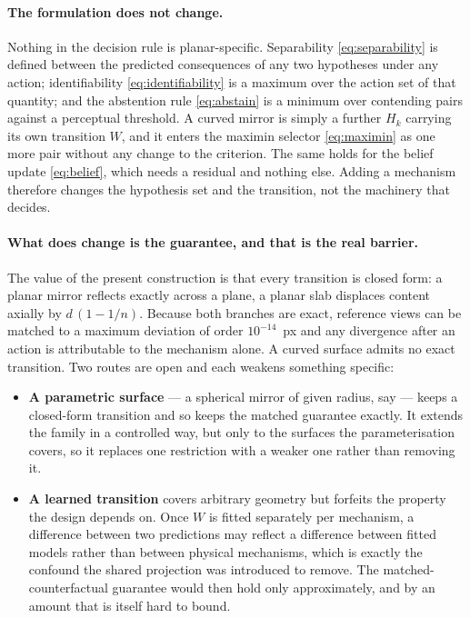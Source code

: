 \paragraph{The formulation does not change.}
Nothing in the decision rule is planar-specific. Separability
\eqref{eq:separability} is defined between the predicted consequences of any two
hypotheses under any action; identifiability \eqref{eq:identifiability} is a
maximum over the action set of that quantity; and the abstention rule
\eqref{eq:abstain} is a minimum over contending pairs against a perceptual
threshold. A curved mirror is simply a further $H_k$ carrying its own transition
$W$, and it enters the maximin selector \eqref{eq:maximin} as one more pair without
any change to the criterion. The same holds for the belief update
\eqref{eq:belief}, which needs a residual and nothing else. Adding a mechanism
therefore changes the hypothesis set and the transition, not the machinery that
decides.

\paragraph{What does change is the guarantee, and that is the real barrier.}
The value of the present construction is that every transition is closed form: a
planar mirror reflects exactly across a plane, a planar slab displaces content
axially by $d\,(1 - 1/n)$. Because both branches are exact, reference views can be
matched to a maximum deviation of order $10^{-14}$~px and any divergence after an
action is attributable to the mechanism alone. A curved surface admits no exact
transition. Two routes are open and each weakens something specific:

\begin{itemize}
\item \textbf{A parametric surface} --- a spherical mirror of given radius, say ---
keeps a closed-form transition and so keeps the matched guarantee exactly. It
extends the family in a controlled way, but only to the surfaces the
parameterisation covers, so it replaces one restriction with a weaker one rather
than removing it.
\item \textbf{A learned transition} covers arbitrary geometry but forfeits the
property the design depends on. Once $W$ is fitted separately per mechanism, a
difference between two predictions may reflect a difference between fitted models
rather than between physical mechanisms, which is exactly the confound the shared
projection was introduced to remove. The matched-counterfactual guarantee would
then hold only approximately, and by an amount that is itself hard to bound.
\end{itemize}

